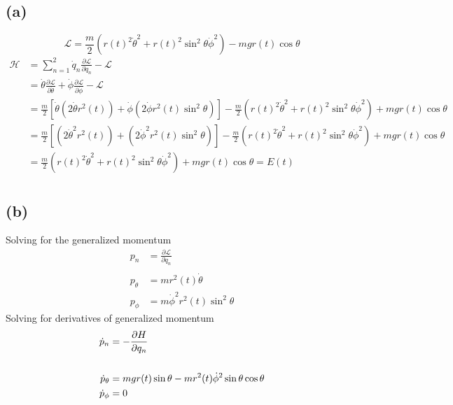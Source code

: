 \documentclass[letter, 10pts]{article}
\begin{document}
\subsection*{(a)} 
\[
\mathcal L 
=
\frac{m}{2} \left(
r(t)^2 \dot{\theta}^2 + 
r(t)^2 \sin ^2 \theta \dot{\phi}^2
\right)
- 
mg r (t) \cos \theta 
\] 
\begin{align*}
	\mathcal H &= \sum_{n=1}^{2} \dot q_n \frac{\partial \mathcal L}{\partial \dot{q}_n} - \mathcal L  
		\\ &=
\dot{\theta} \frac{\partial \mathcal L}{\partial \dot{\theta}} + 
\dot{\phi} \frac{\partial \mathcal L}{\partial \dot{\phi } } - \mathcal L
	\\
&= \frac{m}{2} \left[\dot{\theta} \left(2 \dot{\theta} r^2(t)\right)  + 
\dot{\phi}
\left(2
\dot{\phi} r^2(t) \sin ^2 \theta 
\right)\right] - 
\frac{m}{2} \left(
r(t)^2 \dot{\theta}^2 + 
r(t)^2 \sin ^2 \theta \dot{\phi}^2
\right)
+ 
mg r (t) \cos \theta 
\\
&= \frac{m}{2} \left[ \left(2 \dot{\theta}^2 r^2(t)\right)  + 
\left(2
\dot{\phi}^2 r^2(t) \sin ^2 \theta 
\right)\right] - 
\frac{m}{2} \left(
r(t)^2 \dot{\theta}^2 + 
r(t)^2 \sin ^2 \theta \dot{\phi}^2
\right)
+ 
mg r (t) \cos \theta 
\\
&= \frac{m}{2} \left(
r(t)^2 \dot{\theta}^2 + 
r(t)^2 \sin ^2 \theta \dot{\phi}^2
\right)
+ 
mg r (t) \cos \theta  = E(t)
\\
\end{align*}



\subsection*{(b)}
Solving for the generalized momentum 
\begin{align*}
	p_n &= \frac{\partial \mathcal L}{\partial \dot q_n}\\  \ \\
	p_\theta &= m r^2(t) \dot{\theta}  \\ 
	p_\phi &= m \dot{\phi}^2 r^2 (t) \sin ^2 \theta  
\end{align*}
Solving for derivatives of generalized momentum 
\begin{align*}
	\dot{p}_n &= -  \frac{\partial \mathcal \mathcal H}{\partial q_n}  \\ \ \\
	\dot{p}_\theta &= m g r(t) \sin \theta - m r^2(t) \dot{\phi}^2 \sin \theta \cos \theta  \\  
	\dot{p}_\phi &= 0 
\end{align*}
\end{document}
